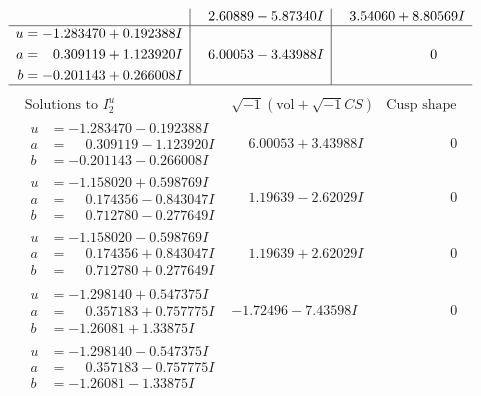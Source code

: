 \documentclass[1p]{elsarticle_modified}
\theoremstyle{definition}
\newcommand{\I}{\sqrt{-1}}
\begin{document}
$$\begin{array}{c|c|c}
 & \phantom{-}2.60889 - 5.87340 I & \phantom{-}3.54060 + 8.80569 I \\ \hline\begin{aligned}
u &= -1.283470 + 0.192388 I \\
a &= \phantom{-}0.309119 + 1.123920 I \\
b &= -0.201143 + 0.266008 I\end{aligned}
 & \phantom{-}6.00053 - 3.43988 I & \phantom{-0.000000 } 0\\
 \hline 
 \end{array}$$\newpage$$\begin{array}{c|c|c}  
\text{Solutions to }I^u_{2}& \I (\text{vol} + \sqrt{-1}CS) & \text{Cusp shape}\\
 \hline 
\begin{aligned}
u &= -1.283470 - 0.192388 I \\
a &= \phantom{-}0.309119 - 1.123920 I \\
b &= -0.201143 - 0.266008 I\end{aligned}
 & \phantom{-}6.00053 + 3.43988 I & \phantom{-0.000000 } 0 \\ \hline\begin{aligned}
u &= -1.158020 + 0.598769 I \\
a &= \phantom{-}0.174356 - 0.843047 I \\
b &= \phantom{-}0.712780 - 0.277649 I\end{aligned}
 & \phantom{-}1.19639 - 2.62029 I & \phantom{-0.000000 } 0 \\ \hline\begin{aligned}
u &= -1.158020 - 0.598769 I \\
a &= \phantom{-}0.174356 + 0.843047 I \\
b &= \phantom{-}0.712780 + 0.277649 I\end{aligned}
 & \phantom{-}1.19639 + 2.62029 I & \phantom{-0.000000 } 0 \\ \hline\begin{aligned}
u &= -1.298140 + 0.547375 I \\
a &= \phantom{-}0.357183 + 0.757775 I \\
b &= -1.26081 + 1.33875 I\end{aligned}
 & -1.72496 - 7.43598 I & \phantom{-0.000000 } 0 \\ \hline\begin{aligned}
u &= -1.298140 - 0.547375 I \\
a &= \phantom{-}0.357183 - 0.757775 I \\
b &= -1.26081 - 1.33875 I\end{aligned}

\end{array}$$
\end{document}
